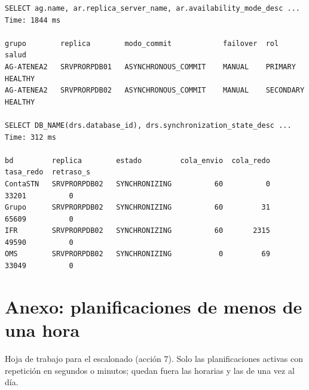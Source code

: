 \documentclass[11pt,a4paper]{article}
\begin{document}
\begin{lstlisting}[style=salida]
SELECT ag.name, ar.replica_server_name, ar.availability_mode_desc ...
Time: 1844 ms

grupo        replica        modo_commit            failover  rol        salud
AG-ATENEA2   SRVPRORPDB01   ASYNCHRONOUS_COMMIT    MANUAL    PRIMARY    HEALTHY
AG-ATENEA2   SRVPRORPDB02   ASYNCHRONOUS_COMMIT    MANUAL    SECONDARY  HEALTHY

SELECT DB_NAME(drs.database_id), drs.synchronization_state_desc ...
Time: 312 ms

bd         replica        estado         cola_envio  cola_redo  tasa_redo  retraso_s
ContaSTN   SRVPRORPDB02   SYNCHRONIZING          60          0      33201          0
Grupo      SRVPRORPDB02   SYNCHRONIZING          60         31      65609          0
IFR        SRVPRORPDB02   SYNCHRONIZING          60       2315      49590          0
OMS        SRVPRORPDB02   SYNCHRONIZING           0         69      33049          0
\end{lstlisting}

\newpage
\section{Anexo: planificaciones de menos de una hora}
\label{sec:anexo}

Hoja de trabajo para el escalonado (acción 7). Solo las planificaciones
activas con repetición en segundos o minutos; quedan fuera las horarias y las
de una vez al día.
\end{document}
